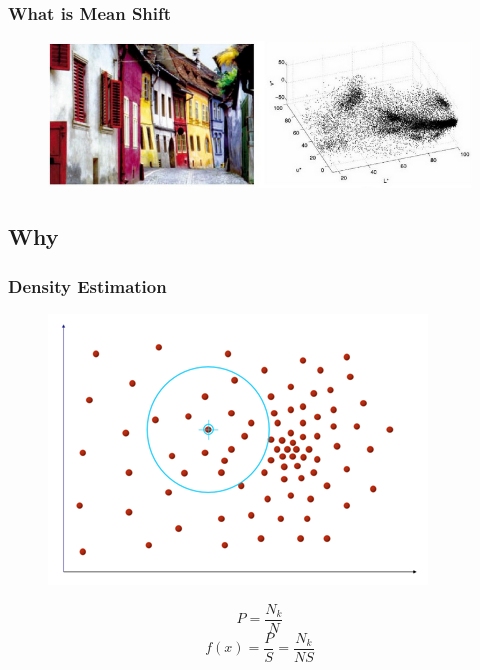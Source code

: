 \documentclass[notheorems,serif,table,compress]{beamer}  %
\begin{document}
\begin{frame}
\frametitle{What is Mean Shift}
    \begin{figure}
      \includegraphics[width=0.8\linewidth]{clustering.png} 
    \end{figure}
\end{frame}

\subsection{Why}
\begin{frame}
\frametitle{Density Estimation}
    \begin{figure}
      \includegraphics[width=0.45\linewidth]{midu.png} 
    \end{figure}
    \begin{displaymath}
            P=\frac{N_{k}}{N}
     \end{displaymath}
     \begin{displaymath}
            f(x)=\frac{P}{S}=\frac{N_{k}}{NS}
      \end{displaymath}
\end{frame}
\end{document}
